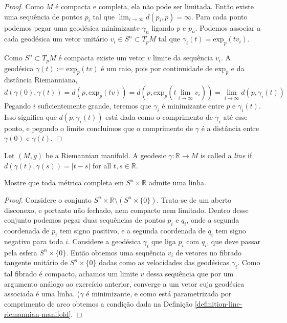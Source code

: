 \begin{proof}
Como $M$ é compacta e completa, ela não pode
ser limitada. Então
existe uma sequência de pontos $p_i$  tal que
$\lim_{i \to \infty}
d(p_i,p)=\infty$. Para cada ponto podemos
pegar uma geodésica minimizante
$\gamma_n$ ligando $p$ e $p_n$. Podemos
associar a cada geodésica um vetor
unitário $v_i \in S^n \subset T_pM$ tal que
$\gamma_i(t)=\text{exp}_p(tv_i)$.

Como $S^n \subset T_pM$ é compacta existe um
vetor $v$ limite da sequência
$v_i$. A geodésica
$\gamma(t):=\text{exp}_p(tv)$ é um raio, pois
por
continuidade de $\text{exp}_p$ e da distância
Riemanniana,
$$
d(\gamma(0),\gamma(t))=d\left(p,\text{exp}
_p(tv)\right)
=d\left(p,\text{exp}_p\left(t\lim_{i \to
\infty} v_i\right)\right)
=\lim_{i \to \infty} d(p,\gamma_i (t))
$$
Pegando $i$ suficientemente grande, teremos
que $\gamma_i$ é minimizante entre
$p$ e $\gamma_i(t)$. Isso significa que
$d(p,\gamma_i(t))$ está dada como o
comprimento de $\gamma_i$ até esse ponto, e
pegando o limite concluímos que o
comprimento de $\gamma$ é a distância entre
$\gamma(0)$ e $\gamma(t)$.
\end{proof}

\begin{definition}
\label{definition-line-riemannian-manifold}
Let $(M,g)$ be a Riemannian manifold. A
geodesic $\gamma:\mathbb{R} \to M$ is
called a {\it line} if
$d(\gamma(t),\gamma(s))=|t-s|$ for all $t,s
\in
\mathbb{R}$.
\end{definition}

\begin{exercise}
\label{exercise-l5-6}
Mostre que toda métrica completa em $S^n
\times \mathbb{R}$ admite uma linha.
\end{exercise}

\begin{proof}
Considere o conjunto $S^n\times
\mathbb{R}\setminus(S^n \times\{0\})$.
Trata-se de um aberto disconexo, e portanto
não fechado, nem compacto nem
limitado.  Dentro desse conjunto podemos
pegar duas sequências de pontos $p_i$ e
$q_i$, onde a segunda coordenada de $p_i$ tem
signo positivo, e a segunda
coordenada de $q_i$ tem  signo negativo para
toda $i$. Considere a geodésica
$\gamma_i$ que liga $p_i$ com $q_i$, que deve
passar pela esfera $S^n\times
\{0\}$. Então obtemos uma sequência $v_i$ de
vetores no fibrado tangente
unitário de $S^n\times\{0\}$ dadas como as
velocidades das geodésicas
$\gamma_i$. Como tal fibrado é compacto,
achamos um limite $v$ dessa sequência
que por um argumento análogo ao exercício
anterior, converge a um vetor cuja
geodésica associada é uma linha. ($\gamma$ é
minimizante, e como está
parametrizada por comprimento de arco obtemos
a condição dada na Definição
\ref{definition-line-riemannian-manifold}.
\end{proof}

